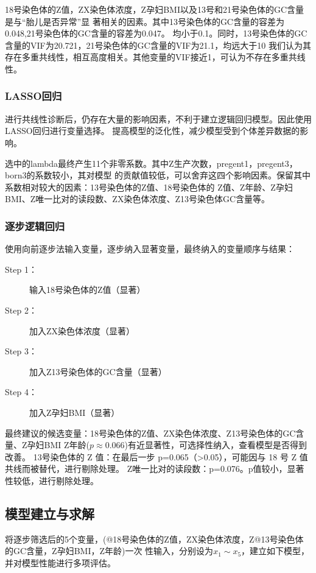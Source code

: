 \documentclass[withoutpreface,notoc]{cumcmthesis}
\begin{document}
	18号染色体的Z值，ZX染色体浓度，Z孕妇BMI以及13号和21号染色体的GC含量是与“胎儿是否异常”显
	著相关的因素。其中13号染色体的GC含量的容差为0.048,21号染色体的GC含量的容差为0.047。
	均小于0.1。同时，13号染色体的GC含量的VIF为20.721，21号染色体的GC含量的VIF为21.1，均远大于10
	我们认为其存在多重共线性，相互高度相关。其他变量的VIF接近1，可认为不存在多重共线性。



	\subsubsection{LASSO回归}
	进行共线性诊断后，仍存在大量的影响因素，不利于建立逻辑回归模型。因此使用LASSO回归进行变量选择。
	提高模型的泛化性，减少模型受到个体差异数据的影响。




	选中的lambda最终产生11个非零系数。其中Z生产次数，pregent1，pregent3，born3的系数较小，其对模型
	的贡献值较低，可以舍弃这四个影响因素。保留其中系数相对较大的因素：13号染色体的Z值、18号染色体的
	Z值、Z年龄、Z孕妇BMI、Z唯一比对的读段数、ZX染色体浓度、Z13号染色体GC含量等。


	\subsubsection{逐步逻辑回归}
	使用向前逐步法输入变量，逐步纳入显著变量，最终纳入的变量顺序与结果：
	\begin{description}
		\item[Step 1：] 输入18号染色体的Z值（显著）
		\item[Step 2：] 加入ZX染色体浓度（显著）
		\item[Step 3：] 加入Z13号染色体的GC含量（显著）
		\item[Step 4：] 加入Z孕妇BMI（显著） 
	\end{description}


	最终建议的候选变量：18号染色体的Z值、ZX染色体浓度、Z13号染色体的GC含量、Z孕妇BMI
	Z年龄($ p \approx 0.066 $)有近显著性，可选择性纳入，查看模型是否得到改善。
	13号染色体的 Z 值：在最后一步 p=0.065（>0.05），可能因与 18 号 Z 值共线而被替代，进行剔除处理。
	Z唯一比对的读段数：p=0.076。p值较小，显著性较低，进行剔除处理。

	\subsection{模型建立与求解}

	将逐步筛选后的5个变量，(@18号染色体的Z值，ZX染色体浓度，Z@13号染色体的GC含量，Z孕妇BMI，Z年龄)一次
	性输入，分别设为$\displaystyle x_{1}\sim x_{5}$，建立如下模型，并对模型性能进行多项评估。
\end{document}
